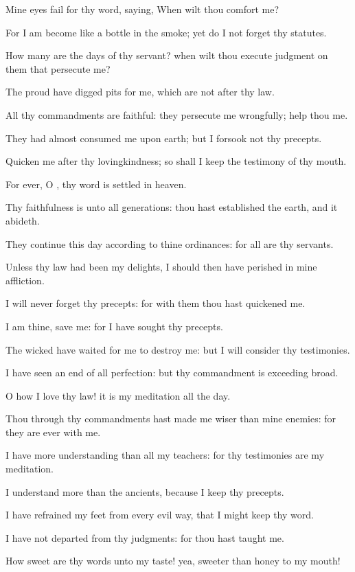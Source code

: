 \verse Mine eyes fail for thy word, saying, When wilt thou comfort me?

\verse For I am become like a bottle in the smoke; yet do I not forget thy statutes.

\verse How many are the days of thy servant? when wilt thou execute judgment on them that persecute me?

\verse The proud have digged pits for me, which are not after thy law.

\verse All thy commandments are faithful: they persecute me wrongfully; help thou me.

\verse They had almost consumed me upon earth; but I forsook not thy precepts.

\verse Quicken me after thy lovingkindness; so shall I keep the testimony of thy mouth.

\verse For ever, O \LORD, thy word is settled in heaven.

\verse Thy faithfulness is unto all generations: thou hast established the earth, and it abideth.

\verse They continue this day according to thine ordinances: for all are thy servants.

\verse Unless thy law had been my delights, I should then have perished in mine affliction.

\verse I will never forget thy precepts: for with them thou hast quickened me.

\verse I am thine, save me: for I have sought thy precepts.

\verse The wicked have waited for me to destroy me: but I will consider thy testimonies.

\verse I have seen an end of all perfection: but thy commandment is exceeding broad.

\verse O how I love thy law! it is my meditation all the day.

\verse Thou through thy commandments hast made me wiser than mine enemies: for they are ever with me.

\verse I have more understanding than all my teachers: for thy testimonies are my meditation.

\verse I understand more than the ancients, because I keep thy precepts.

\verse I have refrained my feet from every evil way, that I might keep thy word.

\verse I have not departed from thy judgments: for thou hast taught me.

\verse How sweet are thy words unto my taste! yea, sweeter than honey to my mouth!

